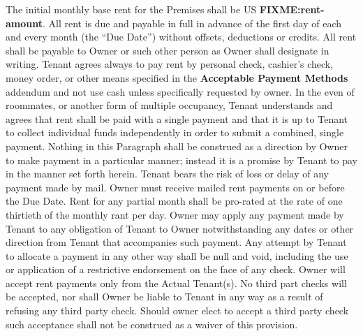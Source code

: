 \documentclass[9pt, letterpaper, oneside]{extarticle}
\newcounter{para}
\newcommand\numparagraph{\par\refstepcounter{para}\textbf{\thepara}\hspace{5mm}}
\newcommand{\rentamount}{FIXME:rent-amount}
\begin{document}
 \numparagraph{\textbf{RENT:}\hspace{2mm}} The initial monthly base rent for the Premises shall be US \textbf{\rentamount}. All rent is due and payable in full in advance of the first day of each and every month (the ``Due Date'') without offsets, deductions or credits. All rent shall be payable to Owner or such other person as Owner shall designate in writing. Tenant agrees always to pay rent by personal check, cashier's check, money order, or other means specified in the \textbf{Acceptable Payment Methods} addendum and not use cash unless specifically requested by owner. In the even of roommates, or another form of multiple occupancy, Tenant understands and agrees that rent shall be paid with a single payment and that it is up to Tenant to collect individual funds independently in order to submit a combined, single payment. Nothing in this Paragraph shall be construed as a direction by Owner to make payment in a particular manner; instead it is a promise by Tenant to pay in the manner set forth herein. Tenant bears the risk of loss or delay of any payment made by mail. Owner must receive mailed rent payments on or before the Due Date. Rent for any partial month shall be pro-rated at the rate of one thirtieth of the monthly rant per day. Owner may apply any payment made by Tenant to any obligation of Tenant to Owner notwithstanding any dates or other direction from Tenant that accompanies such payment. Any attempt by Tenant to allocate a payment in any other way shall be null and void, including the use or application of a restrictive endorsement on the face of any check. Owner will accept rent payments only from the Actual Tenant(s). No third part checks will be accepted, nor shall Owner be liable to Tenant in any way as a result of refusing any third party check. Should owner elect to accept a third party check such acceptance shall not be construed as a waiver of this provision.
\end{document}
